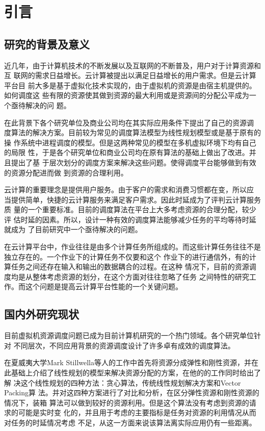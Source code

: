 

\chapter{引言}
\label{chap:introduction}


\section{研究的背景及意义}

近几年，由于计算机技术的不断发展以及互联网的不断普及，用户对于计算资源和互
联网的需求日益增长。云计算被提出以满足日益增长的用户需求。但是云计算平台目
前大多是基于虚拟化技术实现的，由于虚拟机的资源是由宿主机提供的。如何调度这
些有限的资源使其做到资源的最大利用或是资源间的分配公平成为一个亟待解决的问
题。

在此背景下各个研究单位及商业公司均在其实际应用条件下提出了自己的资源调
度算法的解决方案。目前较为常见的调度算法模型为线性规划模型或是基于原有的操
作系统中进程调度的模型。但是这两种常见的模型在多机虚拟环境下均有自己的局限
性，于是各个研究单位和商业公司均在原有算法的基础上做出了改进。并且提出了基
于层次划分的调度方案来解决这些问题。使得调度平台能够做到有效的资源分配进而做
到资源的合理利用。

云计算的重要理念是提供用户服务。由于客户的需求和消费习惯都在变，所以应
当提供简单，快捷的云计算服务来满足客户需求。因此时延成为了评判云计算服务质
量的一个重要标准。目前的调度算法在平台上大多考虑资源的合理分配，较少评
估时延的因素。所以，设计一种有效的调度算法能够减少任务的平均等待时延就成为
了目前研究中一个亟待解决的问题。

在云计算平台中，作业往往是由多个计算任务所组成的。而这些计算任务往往不是独立存在的。一个作业下的计算任务不仅要和这个
作业下的进行通信外，有的计算任务之间还存在输入和输出的数据耦合的过程。在这种
情况下，目前的资源调度均是从整体考虑资源的划分，在这个方面对往往忽略了任务
之间特性的研究工作。而这个问题是提高云计算平台性能的一个关键问题。

\section{国内外研究现状}

目前虚拟机资源调度问题已成为目前计算机研究的一个热门领域。各个研究单位针对
不同层次，不同应用背景的资源调度设计了许多卓有成效的调度算法。

在夏威夷大学Mark Stillwella等人的工作中首先将资源分成弹性和刚性资源，并在
此基础上介绍了线性规划的模型来解决资源分配的方案，在他的的工作同时给出了解
决这个线性规划的四种方法：贪心算法，传统线性规划解决方案和Vector Packing算
法。并对这四种方案进行了对比和分析，在区分弹性资源和刚性资源的情况下，装箱
算法可以做到较好的资源利用。但是这个算法没有考虑到资源的请求的可能是实时变
化的，并且用于考虑的主要指标是任务对资源的利用情况从而对任务的时延情况考虑
不足，从这一方面来说该算法离实际应用仍有一些距离。

